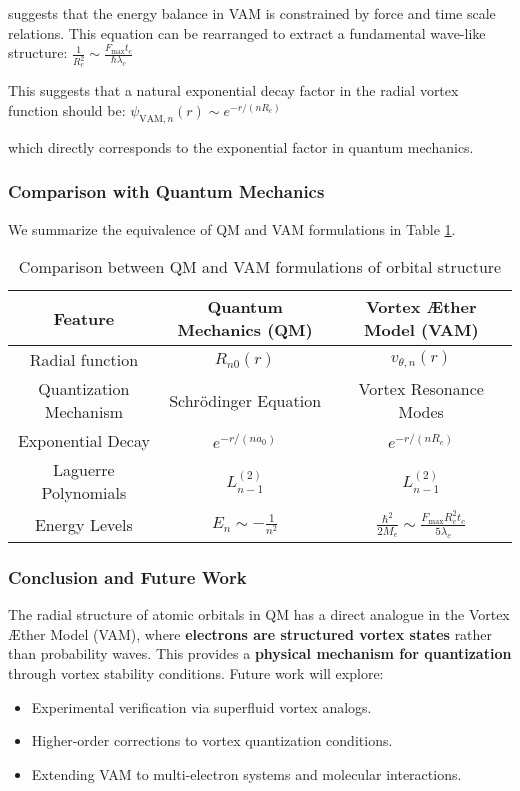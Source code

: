 suggests that the energy balance in VAM is constrained by force and time scale relations. This equation can be rearranged to extract a fundamental wave-like structure:
$\frac{1}{R_c^2} \sim \frac{F_{\max} t_c}{\hbar \lambda_c}$

This suggests that a natural exponential decay factor in the radial vortex function should be:
$\psi_{\text{VAM},n}(r) \sim e^{-r / (n R_c)}$


which directly corresponds to the exponential factor in quantum mechanics.

\subsubsection{Comparison with Quantum Mechanics}
We summarize the equivalence of QM and VAM formulations in Table \ref{tab:qm_vam}.

\begin{table}[h]
    \centering
    \renewcommand{\arraystretch}{1.3}
    \begin{tabular}{|c|c|c|}
        \hline
        \textbf{Feature} & \textbf{Quantum Mechanics (QM)} & \textbf{Vortex Æther Model (VAM)} \\
        \hline
        Radial function & \( R_{n0}(r) \) & \( v_{\theta, n}(r) \) \\
        \hline
        Quantization Mechanism & Schrödinger Equation & Vortex Resonance Modes \\
        \hline
        Exponential Decay & \( e^{-r / (n a_0)} \) & \( e^{-r / (n R_c)} \) \\
        \hline
        Laguerre Polynomials & \( L_{n-1}^{(2)} \) & \( L_{n-1}^{(2)} \) \\
        \hline
        Energy Levels & \( E_n \sim -\frac{1}{n^2} \) & \( \frac{\hbar^2}{2M_e} \sim \frac{F_{\max} R_c^2 t_c}{5 \lambda_c} \) \\
        \hline
    \end{tabular}
    \caption{Comparison between QM and VAM formulations of orbital structure}
    \label{tab:qm_vam}
\end{table}

\subsubsection{Conclusion and Future Work}
The radial structure of atomic orbitals in QM has a direct analogue in the Vortex Æther Model (VAM), where \textbf{electrons are structured vortex states} rather than probability waves. This provides a \textbf{physical mechanism for quantization} through vortex stability conditions. Future work will explore:
\begin{itemize}
    \item Experimental verification via superfluid vortex analogs.
    \item Higher-order corrections to vortex quantization conditions.
    \item Extending VAM to multi-electron systems and molecular interactions.
\end{itemize}


